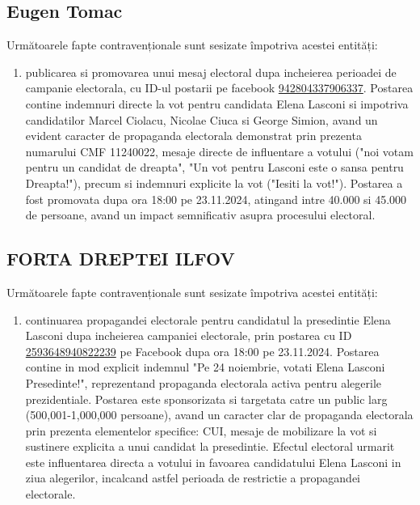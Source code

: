 \documentclass[a4paper,12pt]{article}
\begin{document}
\vspace{0.5cm}

\subsection{Eugen Tomac}
Următoarele fapte contravenționale sunt sesizate împotriva acestei entități:

\begin{enumerate}[leftmargin=*, label=\arabic*.)]
    \item publicarea si promovarea unui mesaj electoral dupa incheierea perioadei de campanie electorala, cu ID-ul postarii pe facebook \href{https://www.facebook.com/ads/library/?id=942804337906337}{942804337906337}. Postarea contine indemnuri directe la vot pentru candidata Elena Lasconi si impotriva candidatilor Marcel Ciolacu, Nicolae Ciuca si George Simion, avand un evident caracter de propaganda electorala demonstrat prin prezenta numarului CMF 11240022, mesaje directe de influentare a votului ("noi votam pentru un candidat de dreapta", "Un vot pentru Lasconi este o sansa pentru Dreapta!"), precum si indemnuri explicite la vot ("Iesiti la vot!"). Postarea a fost promovata dupa ora 18:00 pe 23.11.2024, atingand intre 40.000 si 45.000 de persoane, avand un impact semnificativ asupra procesului electoral.
\end{enumerate}

\vspace{0.5cm}

\subsection{FORTA DREPTEI ILFOV}
Următoarele fapte contravenționale sunt sesizate împotriva acestei entități:

\begin{enumerate}[leftmargin=*, label=\arabic*.)]
    \item continuarea propagandei electorale pentru candidatul la presedintie Elena Lasconi dupa incheierea campaniei electorale, prin postarea cu ID \href{https://www.facebook.com/ads/library/?id=2593648940822239}{2593648940822239} pe Facebook dupa ora 18:00 pe 23.11.2024. Postarea contine in mod explicit indemnul "Pe 24 noiembrie, votati Elena Lasconi Presedinte!", reprezentand propaganda electorala activa pentru alegerile prezidentiale. Postarea este sponsorizata si targetata catre un public larg (500,001-1,000,000 persoane), avand un caracter clar de propaganda electorala prin prezenta elementelor specifice: CUI, mesaje de mobilizare la vot si sustinere explicita a unui candidat la presedintie. Efectul electoral urmarit este influentarea directa a votului in favoarea candidatului Elena Lasconi in ziua alegerilor, incalcand astfel perioada de restrictie a propagandei electorale.
\end{enumerate}
\end{document}
